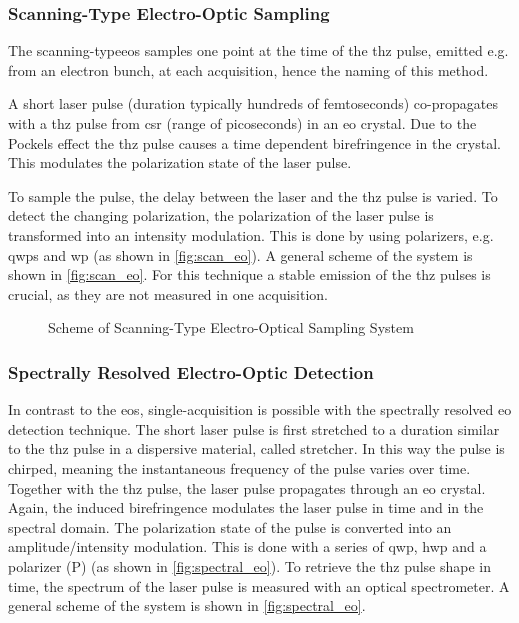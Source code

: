 \subsubsection*{Scanning-Type Electro-Optic Sampling}
The scanning-type\gls{eos} samples one point at the time of the \gls{thz} pulse, emitted e.g. from an electron bunch, at each acquisition, hence the naming of this method.

A short laser pulse (duration typically hundreds of femtoseconds) co-propagates with a \gls{thz} pulse from \gls{csr} (range of picoseconds) in an \gls{eo} crystal. 
Due to the Pockels effect the \gls{thz} pulse causes a time dependent birefringence in the crystal.
This modulates the polarization state of the laser pulse.

To sample the pulse, the delay between the laser and the \gls{thz} pulse is varied.
To detect the changing polarization, the polarization of the laser pulse is transformed into an intensity modulation. This is done by using polarizers, e.g. \glspl{qwp} and \gls{wp} (as shown in \autoref{fig:scan_eo}).
A general scheme of the system is shown in \autoref{fig:scan_eo}.
For this technique a stable emission of the \gls{thz} pulses is crucial, as they are not measured in one acquisition. \cite{roussel2014}
\begin{figure}[H]
	\centering
	\resizebox{1\textwidth}{!}{}
	\caption{Scheme of Scanning-Type Electro-Optical Sampling System \cite{roussel2014}}
	\label{fig:scan_eo}
\end{figure}


\subsubsection*{Spectrally Resolved Electro-Optic Detection}
In contrast to the \gls{eos}, single-acquisition is possible with the spectrally resolved \gls{eo} detection technique.
The short laser pulse is first stretched to a duration similar to the \gls{thz} pulse in a dispersive material, called stretcher.
In this way the pulse is chirped, meaning the instantaneous frequency of the pulse varies over time.
Together with the \gls{thz} pulse, the laser pulse propagates through an \gls{eo} crystal.
Again, the induced birefringence modulates the laser pulse in time and in the spectral domain. 
The polarization state of the pulse is converted into an amplitude/intensity modulation.
This is done with a series of \gls{qwp}, \gls{hwp} and a polarizer (P) (as shown in \autoref{fig:spectral_eo}).
To retrieve the \gls{thz} pulse shape in time, the spectrum of the laser pulse is measured with an optical spectrometer. 
A general scheme of the system is shown in \autoref{fig:spectral_eo}. \cite{roussel2014}

